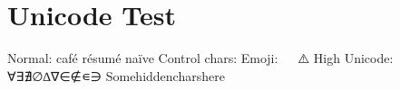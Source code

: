 \documentclass{article}
\begin{document}
\section{Unicode Test}
Normal: café résumé naïve
Control chars: 
Emoji: 🚀 🎯 ⚠️
High Unicode: ∀∃∄∅∆∇∈∉∊∋
Some​hidden​chars​here
\end{document}
